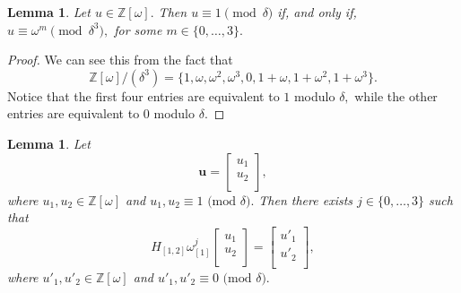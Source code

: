 \documentclass{dalthesis}
\theoremstyle{theorem}
\newtheorem{lemma}[theorem]{Lemma}
\theoremstyle{definition}
\theoremstyle{definition}  %
\theoremstyle{definition}
\newcommand{\Z}{\mathbb{Z}}
\renewcommand{\:}{\mathbin{:}}
\begin{document}
\begin{lemma}
\label{OmegaModLemma}
Let $u\in\Z[\omega].$ Then $u\equiv 1\pmod{\delta}$ if, and only if, $u \equiv \omega^m\pmod{\delta^3},$ for some $m\in\{0,\ldots,3\}.$
\end{lemma}
\begin{proof}
We can see this from the fact that \[\Z[\omega]/(\delta^3) = \{1,\omega,\omega^2,\omega^3,0,1+\omega,1+\omega^2,1+\omega^3\}.\]
 Notice that the first four entries are equivalent to $1$ modulo $\delta,$ while the other entries are equivalent to $0$ modulo $\delta.$
\end{proof}
\begin{lemma}
\label{RowReductLemma}
Let 
\[\boldsymbol{u} = \left[\begin{array}{c}
u_1\\
u_2\\
\end{array}\right],\] where $u_1,u_2\in\Z[\omega]$ and  $u_1,u_2\equiv 1\mbox{ (mod }\delta).$ Then there exists $j\in\{0,\ldots,3\}$ such that \[H_{[1,2]}\omega_{[1]}^j\left[\begin{array}{c}
u_1\\
u_2\\
\end{array}\right] = \left[\begin{array}{c}
u'_1\\
u'_2\\
\end{array}\right],\] where $u'_1,u'_2\in\Z[\omega]$ and $u
'_1,u'_2\equiv 0\mbox{ (mod }\delta).$
\end{lemma}
\end{document}
